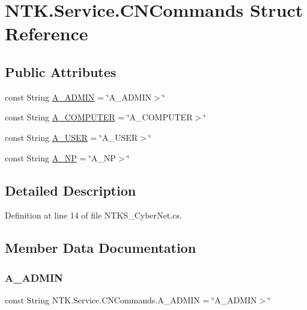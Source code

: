 \hypertarget{struct_n_t_k_1_1_service_1_1_c_n_commands}{}\section{N\+T\+K.\+Service.\+C\+N\+Commands Struct Reference}
\label{struct_n_t_k_1_1_service_1_1_c_n_commands}
\subsection*{Public Attributes}
\begin{DoxyCompactItemize}
\item 
const String \mbox{\hyperlink{struct_n_t_k_1_1_service_1_1_c_n_commands_a5f2d6d05923fb35679d9bef1b1d0f2d0}{A\+\_\+\+A\+D\+M\+IN}} = \char`\"{}A\+\_\+\+A\+D\+M\+IN$>$\char`\"{}
\item 
const String \mbox{\hyperlink{struct_n_t_k_1_1_service_1_1_c_n_commands_a9b1d2c79059416db6172a865b96c42ea}{A\+\_\+\+C\+O\+M\+P\+U\+T\+ER}} = \char`\"{}A\+\_\+\+C\+O\+M\+P\+U\+T\+ER$>$\char`\"{}
\item 
const String \mbox{\hyperlink{struct_n_t_k_1_1_service_1_1_c_n_commands_a8f222e6e2c51d7e7f3d76ce179389f5d}{A\+\_\+\+U\+S\+ER}} = \char`\"{}A\+\_\+\+U\+S\+ER$>$\char`\"{}
\item 
const String \mbox{\hyperlink{struct_n_t_k_1_1_service_1_1_c_n_commands_ab5cd6f36b2374847020b22ef74e5fa22}{A\+\_\+\+NP}} = \char`\"{}A\+\_\+\+NP$>$\char`\"{}
\end{DoxyCompactItemize}


\subsection{Detailed Description}


Definition at line 14 of file N\+T\+K\+S\+\_\+\+Cyber\+Net.\+cs.



\subsection{Member Data Documentation}
\mbox{\label{struct_n_t_k_1_1_service_1_1_c_n_commands_a5f2d6d05923fb35679d9bef1b1d0f2d0}} 
\subsubsection{\texorpdfstring{A\_ADMIN}{A\_ADMIN}}
{\footnotesize\ttfamily const String N\+T\+K.\+Service.\+C\+N\+Commands.\+A\+\_\+\+A\+D\+M\+IN = \char`\"{}A\+\_\+\+A\+D\+M\+IN$>$\char`\"{}}



